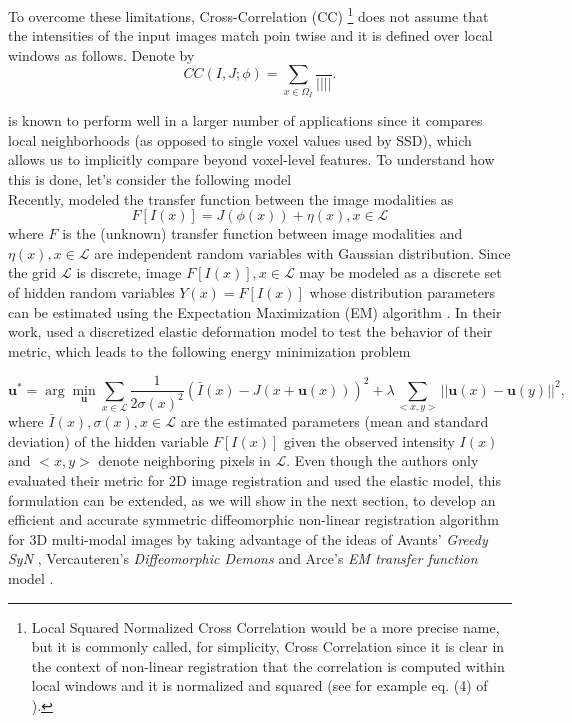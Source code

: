 To overcome these limitations, Cross-Correlation (CC) \footnote{Local Squared Normalized Cross Correlation would be a more precise name, but it is commonly called, for simplicity, Cross Correlation since it is clear in the context of non-linear registration that the correlation is computed within local windows and it is normalized and squared (see for example eq. (4) of \cite{Avants2008}).} does not assume that the intensities of the input images match poin twise and it is defined over local windows as follows. Denote by
\begin{equation}\label{eq:cc_functional}
    CC(I, J; \phi) = \sum_{x \in \Omega_{I}} \frac{}{||||}.
\end{equation}




is known to perform well in a larger number of applications since it compares local neighborhoods (as opposed to single voxel values used by SSD), which allows us to implicitly compare beyond voxel-level features. To understand how this is done, let's consider the following model\\

Recently, \cite{Arce-santana2014} modeled the transfer function between the image modalities as
\begin{equation}\label{eq:arce_model}
    F[I(x)] = J(\phi(x)) + \eta(x), x\in \mathcal{L}
\end{equation}
where $F$ is the (unknown) transfer function between image modalities and $\eta(x), x\in \mathcal{L}$ are independent random variables with Gaussian distribution. Since the grid $\mathcal{L}$ is discrete, image $F[I(x)], x\in \mathcal{L}$ may be modeled as a discrete set of hidden random variables $Y(x) = F[I(x)]$ whose distribution parameters
can be estimated using the Expectation Maximization (EM) algorithm \citep{Dempster1977}. In their work, \cite{Arce-santana2014} used a discretized elastic
deformation model to test the behavior of their metric, which leads to the following energy minimization problem

\begin{equation}\label{eq:arce_elastic}
    \mathbf{u}^{*} = \arg \min_{\mathbf{u}} \sum_{x \in \mathcal{L}} \frac{1}{2 \sigma(x)^{2}} ( \bar{I}(x) - J(x + \mathbf{u}(x)))^{2} + \lambda \sum_{<x, y>} ||\mathbf{u}(x) - \mathbf{u}(y)||^{2},
\end{equation}
where $\bar{I}(x), \sigma(x), x\in \mathcal{L}$ are the estimated parameters (mean and standard deviation) of the hidden variable $F[I(x)]$ given the
observed intensity $I(x)$ and $<x, y>$ denote neighboring pixels in $\mathcal{L}$. Even though the authors only evaluated their metric for 2D image registration and used
the elastic model, this formulation can be extended, as we will show in the next section, to develop an efficient and accurate symmetric diffeomorphic non-linear registration algorithm for 3D multi-modal images by taking advantage of the ideas of Avants' \textit{Greedy SyN} \citep{Avants2008}, Vercauteren's \textit{Diffeomorphic Demons} \citep{Vercauteren2009} and Arce's \textit{EM transfer function} model \citep{Arce-santana2014}.


